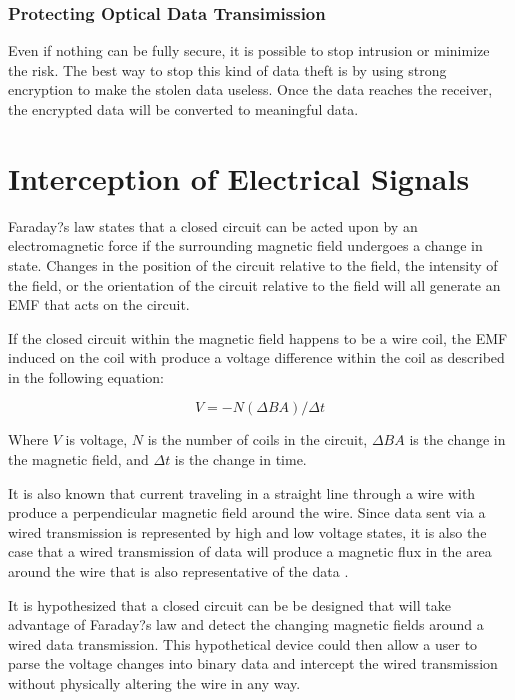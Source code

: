 \documentclass{article}
\begin{document}
\subsubsection{Protecting Optical Data Transimission}
Even if nothing can be fully secure, it is possible to stop intrusion or minimize the risk. The best way to stop this kind of data theft is by using strong encryption to make the stolen data useless. Once the data reaches the receiver, the encrypted data will be converted to meaningful data. 

\section{Interception of Electrical Signals}

Faraday?s law states that a closed circuit can be acted upon by an electromagnetic force if the surrounding magnetic field undergoes a change in state. Changes in the position of the circuit relative to the field, the intensity of the field, or the orientation of the circuit relative to the field will all generate an EMF that acts on the circuit. \cite{faraday}

If the closed circuit within the magnetic field happens to be a wire coil, the EMF induced on the coil with produce a voltage difference within the coil as described in the following equation:

\begin{equation*}
 V = -N(\Delta B A)/\Delta t
 \end{equation*}
 
Where $V$ is voltage, $N$ is the number of coils in the circuit, $\Delta B A$ is the change in the magnetic field, and $\Delta t$ is the change in time.
 
It is also known that current traveling in a straight line through a wire with produce a perpendicular magnetic field around the wire. Since data sent via a wired transmission is represented by high and low voltage states, it is also the case that a wired transmission of data will produce a magnetic flux in the area around the wire that is also representative of the data \cite{magneticfields}.
 
It is hypothesized that a closed circuit can be be designed that will take advantage of Faraday?s law and detect the changing magnetic fields around a wired data transmission. This hypothetical device could then allow a user to parse the voltage changes into binary data and intercept the wired transmission without physically altering the wire in any way.
\end{document}
